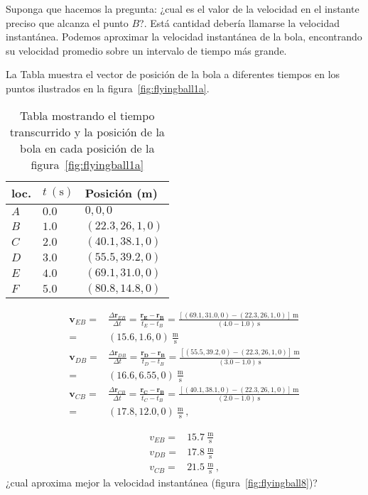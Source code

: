 Suponga que hacemos la pregunta: ¿cual es el valor de la velocidad en el instante preciso que alcanza el punto $B$?. Está cantidad debería llamarse la velocidad instantánea. Podemos aproximar la velocidad instantánea de la bola, encontrando su velocidad promedio sobre un intervalo de tiempo más grande. 

La Tabla muestra el vector de posición de la bola a diferentes tiempos en los puntos ilustrados en la figura~\ref{fig:flyingball1a}.

\begin{table}
  \centering
  \begin{tabular}{lll}
    loc. & $t\ (\text{s})$ & Posición (m)\\\hline
    $A$ & $0.0$ &$0,0,0$ \\
    $B$ & $1.0$ &$(22.3,26,1,0)$ \\
    $C$ & $2.0$ &$(40.1,38.1,0)$ \\
    $D$ & $3.0$ &$(55.5,39.2,0)$ \\
    $E$ & $4.0$ &$(69.1,31.0,0)$ \\
    $F$ & $5.0$ &$(80.8,14.8,0)$ \\\hline
  \end{tabular}
  \caption{Tabla mostrando el tiempo transcurrido y la posición de la bola en cada posición de la figura~\ref{fig:flyingball1a}}
  \label{tab:flyingball1a}
\end{table}

\begin{align}
  \mathbf{v}_{EB}=&\frac{\Delta \mathbf{r}_{EB}}{\Delta t}
=\frac{\mathbf{\mathbf{r}_E-\mathbf{r}_B}}{t_E-t_B}=
\frac{[(69.1,31.0,0)-(22.3,26,1,0)]\ \text{m}}{(4.0-1.0)\ \text{s}}\nonumber\\
=&(15.6,1.6,0)\ \frac{\text{m}}{\text{s}}\nonumber\\
  \mathbf{v}_{DB}=&\frac{\Delta \mathbf{r}_{DB}}{\Delta t}
=\frac{\mathbf{\mathbf{r}_D-\mathbf{r}_B}}{t_D-t_B}=
\frac{[(55.5,39.2,0)-(22.3,26,1,0)]\ \text{m}}{(3.0-1.0)\ \text{s}}\nonumber\\
=&(16.6,6.55,0)\ \frac{\text{m}}{\text{s}}\nonumber\\
  \mathbf{v}_{CB}=&\frac{\Delta \mathbf{r}_{CB}}{\Delta t}
=\frac{\mathbf{\mathbf{r}_C-\mathbf{r}_B}}{t_C-t_B}=
\frac{[(40.1,38.1,0)-(22.3,26,1,0)]\ \text{m}}{(2.0-1.0)\ \text{s}}\nonumber\\
=&(17.8,12.0,0)\ \frac{\text{m}}{\text{s}}\,,
\end{align}

\begin{align}
  v_{EB}=&15.7\ \frac{\text{m}}{\text{s}}\nonumber\\
  v_{DB}=&17.8\ \frac{\text{m}}{\text{s}}\nonumber\\
  v_{CB}=&21.5\ \frac{\text{m}}{\text{s}}\,,
\end{align}
¿cual aproxima mejor la velocidad instantánea (figura~\ref{fig:flyingball8})?

